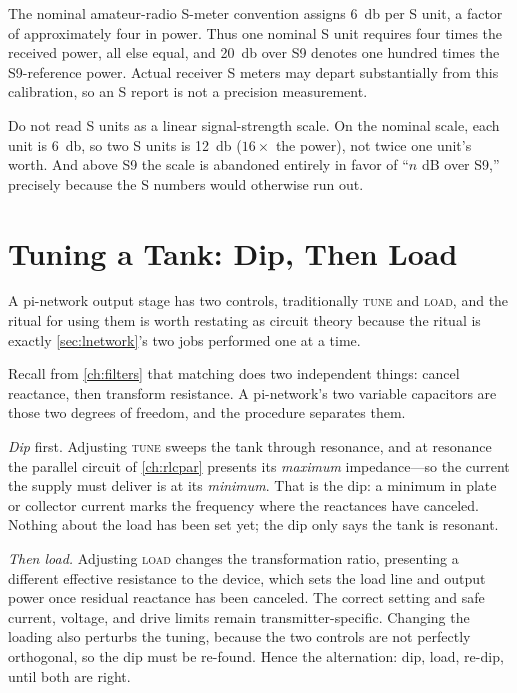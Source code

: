 The nominal amateur-radio S-meter convention assigns \SI{6}{\decibel} per S unit,
a factor of approximately four in power. Thus one nominal S unit requires four
times the received power, all else equal, and \SI{20}{\decibel} over S9 denotes one
hundred times the S9-reference power. Actual receiver S meters may depart
substantially from this calibration, so an S report is not a precision measurement.

\begin{mistakebox}
Do not read S units as a linear signal-strength scale. On the nominal scale, each unit is
\SI{6}{\decibel}, so two S units is \SI{12}{\decibel} (\(16\times\) the power), not
twice one unit's worth. And above S9 the scale is abandoned entirely in favor of
``\(n\) dB over S9,'' precisely because the S numbers would otherwise run out.
\end{mistakebox}

\section{Tuning a Tank: Dip, Then Load}
\label{sec:diploading}
A pi-network output stage has two controls, traditionally \textsc{tune} and
\textsc{load}, and the ritual for using them is worth restating as circuit theory
because the ritual is exactly \cref{sec:lnetwork}'s two jobs performed one at a time.

Recall from \cref{ch:filters} that matching does two independent things: cancel
reactance, then transform resistance. A pi-network's two variable capacitors are those
two degrees of freedom, and the procedure separates them.

\emph{Dip} first. Adjusting \textsc{tune} sweeps the tank through resonance, and at
resonance the parallel circuit of \cref{ch:rlcpar} presents its \emph{maximum}
impedance---so the current the supply must deliver is at its \emph{minimum}. That is
the dip: a minimum in plate or collector current marks the frequency where the
reactances have canceled. Nothing about the load has been set yet; the dip only says
the tank is resonant.

\emph{Then load.} Adjusting \textsc{load} changes the transformation ratio, presenting
a different effective resistance to the device, which sets the load line and output
power once residual reactance has been canceled. The correct setting and safe current,
voltage, and drive limits remain transmitter-specific. Changing the loading also
perturbs the tuning, because the two
controls are not perfectly orthogonal, so the dip must be re-found. Hence the
alternation: dip, load, re-dip, until both are right.

